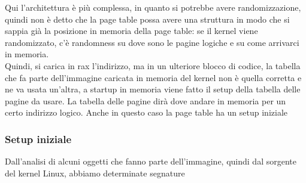 \documentclass[12pt, oneside]{extbook}
\begin{document}
Qui l'architettura è  più complessa, in quanto si potrebbe avere randomizzazione, quindi non è detto che la page table possa avere una struttura in modo che si sappia già la posizione in memoria della page table: se il kernel viene randomizzato, c'è randomness su dove sono le pagine logiche e su come arrivarci in memoria.\\ Quindi, si carica in rax l'indirizzo, ma in un ulteriore blocco di codice, la tabella che fa parte dell'immagine caricata in memoria del kernel non è quella corretta e ne va usata un'altra, a startup in memoria viene fatto il setup della tabella delle pagine da usare. La tabella delle pagine dirà dove andare in memoria per un certo indirizzo logico. Anche in questo caso la page table ha un setup iniziale
\subsubsection{Setup iniziale}
Dall'analisi di alcuni oggetti che fanno parte dell'immagine, quindi dal sorgente del kernel Linux, abbiamo determinate segnature
\end{document}
